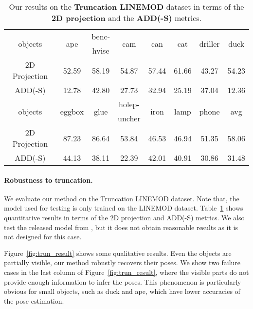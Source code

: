 \documentclass[10pt,twocolumn,letterpaper]{article}
\begin{document}
\begin{table}
\begin{center}
\scalebox{0.75}
{
\begin{tabular}{|c|ccccccc|}
\hline
 \multirow{2}{*}{objects} & \multirow{2}{*}{ape} & benc- & \multirow{2}{*}{cam}  & \multirow{2}{*}{can} &  \multirow{2}{*}{cat} & \multirow{2}{*}{driller} & \multirow{2}{*}{duck} \\ 
 &  & hvise  & & & & & \\ \hline
2D Projection & 52.59 & 58.19 & 54.87 & 57.44 & 61.66 & 43.27 & 54.23 \\
ADD(-S) & 12.78 & 42.80 & 27.73 & 32.94 & 25.19 & 37.04 & 12.36 \\ \hline
 \multirow{2}{*}{objects} & \multirow{2}{*}{eggbox} & \multirow{2}{*}{glue} & holep- & \multirow{2}{*}{iron} & \multirow{2}{*}{lamp} & \multirow{2}{*}{phone}  & \multirow{2}{*}{avg} \\
 & & & uncher & & & & \\ \hline
2D Projection & 87.23 & 86.64 & 53.84 & 46.53 & 46.94 & 51.35 & 58.06 \\
ADD(-S) & 44.13 & 38.11 & 22.39 & 42.01 & 40.91 & 30.86 & 31.48 \\
\hline
\end{tabular}
}
\end{center}
	\vspace{-0.2mm}
\caption{Our results on the \textbf{Truncation LINEMOD} dataset in terms of the \textbf{2D projection} and the \textbf{ADD(-S)} metrics.}
	\vspace{-4mm}
\label{tab:trun_result}
\end{table}
 
\paragraph{Robustness to truncation.} We evaluate our method on the Truncation LINEMOD dataset. Note that, the model used for testing is only trained on the LINEMOD dataset. Table~\ref{tab:trun_result} shows quantitative results in terms of the 2D projection and ADD(-S) metrics. We also test the released model from \cite{tekin2018real}, but it does not obtain reasonable results as it is not designed for this case.

Figure~\ref{fig:trun_result} shows some qualitative results. Even the objects are partially visible, our method robustly recovers their poses. We show two failure cases in the last column of Figure~\ref{fig:trun_result}, where the visible parts do not provide enough information to infer the poses. 
This phenomenon is particularly obvious for small objects, such as duck and ape, which have lower accuracies of the pose estimation.
\end{document}

